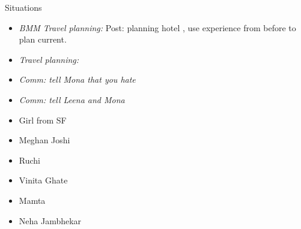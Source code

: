 \documentclass[serif, mathserif, final]{beamer}
\begin{document}
\begin{frame}{}
\begin{columns}
\begin{column}{0.20\linewidth}
\begin{block}{Situations}
\begin{itemize}
          \item \tiny \textit{BMM Travel planning:} Post: planning
            hotel , use experience from before to plan current. 
          \item \tiny \textit{Travel planning:} 
                     
          \item \tiny \textit{Comm: tell Mona that you hate} 
          \item \tiny \textit{Comm: tell Leena and Mona} 
            
    \end{itemize} 

  \end{block}

\begin{block} 

\begin{itemize} 
\small \item \small Girl from SF 
\small \item \small Meghan Joshi 
\small \item \small Ruchi 
\small \item \small Vinita Ghate 

\small \item \small Mamta
\small \item \small Neha Jambhekar 


\end{itemize} 

\end{block} 
\end{column}%

\end{columns}

\end{frame}
\end{document}
